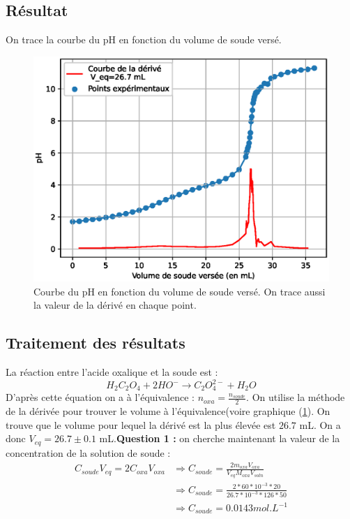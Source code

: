 \documentclass[12pt]{article}
\begin{document}
\newpage	
	\subsection{Résultat}
On trace la courbe du pH en fonction du volume de soude versé.
\begin{figure}[h!]
	\begin{center}
		\includegraphics[scale=0.7]{Titrage_1.eps}
		\caption{Courbe du pH en fonction du volume de soude versé. On trace aussi la valeur de la dérivé en chaque point.}
		\label{Titrage_soude}
	\end{center}
\end{figure}	
	
	\subsection{Traitement des résultats}
	
La réaction entre l'acide oxalique et la soude est :
\begin{equation}
H_2C_2O_4+ 2 HO^- \longrightarrow C_2O_4^{2-} + H_2O
\end{equation}
D'après cette équation on a à l'équivalence : $n_{oxa}=\frac{n_{soude}}{2}$. On utilise la méthode de la dérivée pour trouver le volume à l'équivalence(voire graphique (\ref{Titrage_soude}). On trouve que le volume pour lequel la dérivé est la plus élevée est $26.7$ mL. On a donc $V_{eq}=26.7\pm 0.1 $ mL.\textbf{Question 1 :} on cherche maintenant la valeur de la concentration de la solution de soude :
	\begin{align*}
C_{soude}V_{eq}=2C_{oxa}V_{oxa}& \Longrightarrow C_{soude} = \frac{2 m_{oxa} V_{oxa}}{V_{eq} M_{oxa} V_{soln}} \\
& \Longrightarrow C_{soude} = \frac{2*60*10^{-3}*20}{26.7*10^{-3}*126*50}\\ & \Longrightarrow C_{soude} =  0.0143 mol.L^{-1}		
	\end{align*}
	
\end{document}
